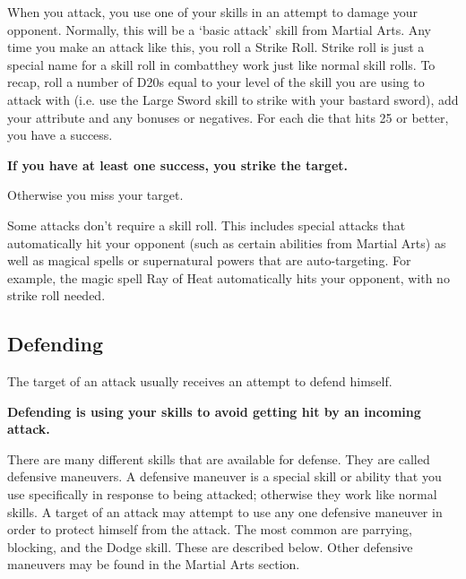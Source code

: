 \documentclass[twoside]{book}
\begin{document}
    {  
     When you attack, you use one of your skills in an
              attempt to damage your opponent. Normally, this will be a
              `basic attack' skill from Martial Arts. Any
              time you make an attack like this, you roll a Strike Roll.
              Strike roll is just a special name for a skill roll in
              combatthey work just like normal skill rolls. To
              recap, roll a number of D20s equal to your level of the
              skill you are using to attack with (i.e. use the Large
              Sword skill to strike with your bastard sword), add your
              attribute and any bonuses or negatives. For each die that
              hits 25 or better, you have a success.
               

 \textbf{ If you have at least one success, you strike the
                target. }

  Otherwise you miss your target.
            
    }
  
    {  
     Some attacks don't require a skill roll. This
               includes special attacks that automatically hit your
               opponent (such as certain abilities from Martial Arts) as
               well as magical spells or supernatural powers that are
               auto-targeting. For example, the magic spell Ray of Heat
               automatically hits your opponent, with no strike roll
               needed. 
    }
  
    

\subsection{Defending}
    
    {  
     The target of an attack usually receives an attempt
              to defend himself.
               

 \textbf{ Defending is using your skills to avoid getting hit
                by an incoming attack. }

  There are many different
                skills that are available for defense. They are called
                defensive maneuvers. A defensive maneuver is a special
                skill or ability that you use specifically in response to
                being attacked; otherwise they work like normal skills. A
                target of an attack may attempt to use any one defensive
                maneuver in order to protect himself from the attack. The
                most common are parrying, blocking, and the Dodge skill.
                These are described below. Other defensive maneuvers may
                be found in the Martial Arts section.
            
    }
  
\end{document}
